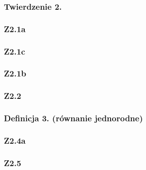 \documentclass[10pt,a4paper]{article}
\begin{document}
{\begin{tcolorbox}[mybox]
    \subsubsection*{Twierdzenie 2.}
    \begin{quote}
    \end{quote}
    \end{tcolorbox}

    \subsubsection*{Z2.1a}
    \begin{quote}
    \end{quote}

    \subsubsection*{Z2.1c}
    \begin{quote}
    \end{quote}

    \subsubsection*{Z2.1b}
    \begin{quote}
    \end{quote}

    \subsubsection*{Z2.2}
    \begin{quote}
    \end{quote}

    \begin{tcolorbox}[mybox]
    \subsubsection*{Definicja 3. (równanie jednorodne)}
    \begin{quote}
    \end{quote}
    \end{tcolorbox}

    \subsubsection*{Z2.4a}
    \begin{quote}
    \end{quote}

    \subsubsection*{Z2.5}
    \begin{quote}
    \end{quote}
}
\end{document}
